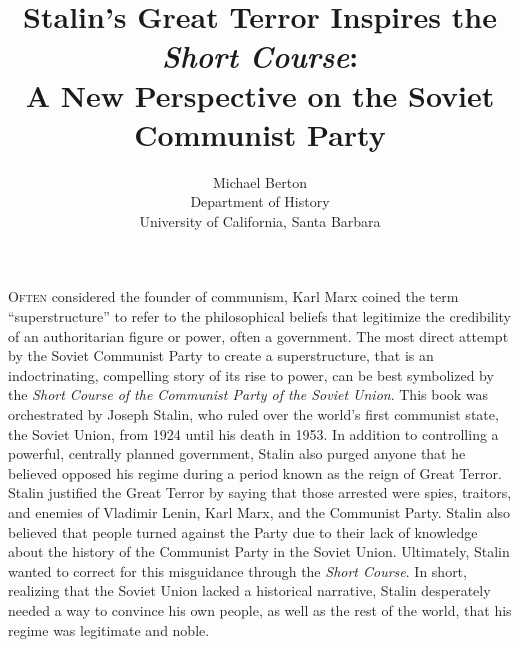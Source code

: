 \documentclass[a4paper, twocolumn]{article}
\date{}
\title{Stalin's Great Terror Inspires the \emph{Short Course}:\\A New Perspective on
   the Soviet Communist Party}
\author{Michael Berton\\ Department of History \\ University of California, Santa Barbara}
\begin{document}
\maketitle

\begingroup
{}


\lettrine[nindent=0cm]{O}{ften} considered the founder of communism,
Karl Marx coined the term ``superstructure''
to refer to the philosophical beliefs that legitimize the
credibility of an authoritarian figure or power, often a
government. The most direct attempt by the Soviet Communist Party to create a
superstructure, that is an indoctrinating, compelling story of its
rise to power, can be best symbolized by the \emph{Short Course of the Communist Party of the Soviet Union}. This book was orchestrated by Joseph Stalin, who ruled over the
world's first communist state, the Soviet Union, from 1924 until his
death in 1953. In addition to controlling a powerful, centrally
planned government, Stalin also purged anyone that he believed opposed
his regime during a period known as the reign of Great Terror. Stalin
justified the Great Terror by saying that those arrested were spies,
traitors, and enemies of Vladimir Lenin, Karl Marx, and the Communist
Party. Stalin also believed that people turned against the Party due
to their lack of knowledge about the history of the Communist Party in
the Soviet Union. Ultimately, Stalin wanted to correct for this
misguidance through the \emph{Short Course}. In short, realizing that the Soviet Union
lacked a historical narrative, Stalin desperately needed a way to
convince his own people, as well as the rest of the world, that his
regime was legitimate and noble. 
\end{document}
